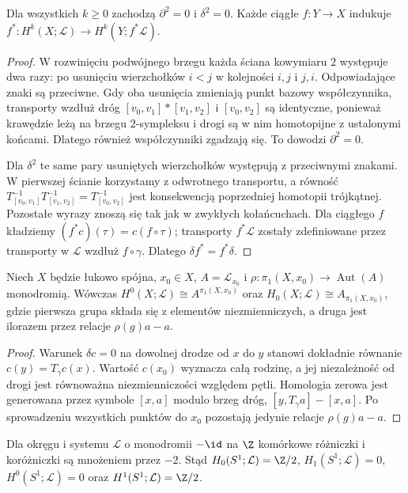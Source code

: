 \begin{stwierdzenie}
\label{prop:local-delta-v4}
Dla wszystkich $k\ge0$ zachodzą $\partial^2=0$ i
$\delta^2=0$. Każde ciągłe $f:Y\to X$ indukuje
$f^*:H^k(X;\mathcal L)\to H^k(Y;f^*\mathcal L)$.
\end{stwierdzenie}
\begin{proof}
W rozwinięciu podwójnego brzegu każda ściana
kowymiaru $2$ występuje dwa razy: po usunięciu
wierzchołków $i<j$ w kolejności $i,j$ i $j,i$.
Odpowiadające znaki są przeciwne. Gdy oba usunięcia
zmieniają punkt bazowy współczynnika, transporty
wzdłuż dróg $[v_0,v_1]*[v_1,v_2]$ i $[v_0,v_2]$
są identyczne, ponieważ krawędzie leżą na brzegu
$2$-sympleksu i drogi są w nim homotopijne z ustalonymi
końcami. Dlatego również współczynniki zgadzają się.
To dowodzi $\partial^2=0$.

Dla $\delta^2$ te same pary usuniętych wierzchołków
występują z przeciwnymi znakami. W pierwszej ścianie
korzystamy z odwrotnego transportu, a równość
$T_{[v_0,v_1]}^{-1}T_{[v_1,v_2]}^{-1}
=T_{[v_0,v_2]}^{-1}$ jest konsekwencją poprzedniej
homotopii trójkątnej. Pozostałe wyrazy znoszą się tak
jak w zwykłych kołańcuchach. Dla ciągłego $f$
kładziemy $(f^*c)(\tau)=c(f\circ\tau)$;
transporty $f^*\mathcal L$ zostały zdefiniowane
przez transporty w $\mathcal L$ wzdłuż $f\circ\gamma$.
Dlatego $\delta f^*=f^*\delta$.
\end{proof}

\begin{stwierdzenie}
Niech $X$ będzie łukowo spójna, $x_0\in X$,
$A=\mathcal L_{x_0}$ i
$\rho:\pi_1(X,x_0)\to\operatorname{Aut}(A)$ monodromią.
Wówczas $H^0(X;\mathcal L)\cong A^{\pi_1(X,x_0)}$
oraz $H_0(X;\mathcal L)\cong A_{\pi_1(X,x_0)}$,
gdzie pierwsza grupa składa się z elementów niezmienniczych,
a druga jest ilorazem przez relacje $\rho(g)a-a$.
\end{stwierdzenie}
\begin{proof}
Warunek $\delta c=0$ na dowolnej drodze od $x$ do $y$
stanowi dokładnie równanie $c(y)=T_\gamma c(x)$.
Wartość $c(x_0)$ wyznacza całą rodzinę, a jej
niezależność od drogi jest równoważna niezmienniczości
względem pętli. Homologia zerowa jest generowana przez
symbole $[x,a]$ modulo brzeg dróg,
$[y,T_\gamma a]-[x,a]$. Po sprowadzeniu wszystkich
punktów do $x_0$ pozostają jedynie relacje
$\rho(g)a-a$.
\end{proof}

\begin{przyklad}
Dla okręgu i systemu $\mathcal L$ o monodromii
$-\id$ na $\Z$ komórkowe różniczki i koróżniczki są
mnożeniem przez $-2$. Stąd
$H_0(S^1;\mathcal L)=\Z/2$,
$H_1(S^1;\mathcal L)=0$,
$H^0(S^1;\mathcal L)=0$ oraz
$H^1(S^1;\mathcal L)=\Z/2$.
\end{przyklad}

